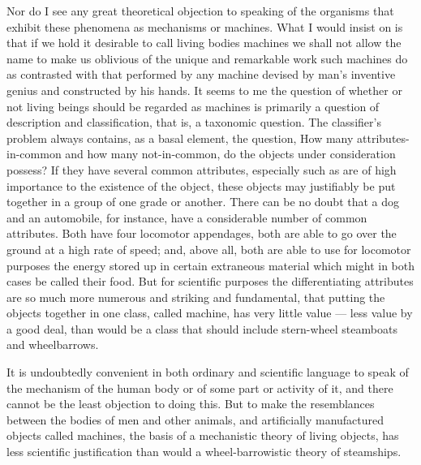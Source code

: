 \documentclass[a4paper, 11pt, oneside, polutonikogreek, english]{article}
\begin{document}
Nor do I see any great theoretical objection to speaking of the organisms that exhibit these phenomena as mechanisms or machines. What I would insist on is that if we hold it desirable to call living bodies machines we shall not allow the name to make us oblivious of the unique and remarkable work such machines do as contrasted with that performed by any machine devised by man's inventive genius and constructed by his hands. It seems to me the question of whether or not living beings should be regarded as machines is primarily a question of description and classification, that is, a taxonomic question. The classifier's problem always contains, as a basal element, the question, How many attributes-in-common and how many not-in-common, do the objects under consideration possess? If they have several common attributes, especially such as are of high importance to the existence of the object, these objects may justifiably be put together in a group of one grade or another. There can be no doubt that a dog and an automobile, for instance, have a considerable number of common attributes. Both have four locomotor appendages, both are able to go over the ground at a high rate of speed; and, above all, both are able to use for locomotor purposes the energy stored up in certain extraneous material which might in both cases be called their food. But for scientific purposes the differentiating attributes are so much more numerous and striking and fundamental, that putting the objects together in one class, called machine, has very little value --- less value by a good deal, than would be a class that should include stern-wheel steamboats and wheelbarrows.

It is undoubtedly convenient in both ordinary and scientific language to speak of the mechanism of the human body or of some part or activity of it, and there cannot be the least objection to doing this. But to make the resemblances between the bodies of men and other animals, and artificially manufactured objects called machines, the basis of a mechanistic theory of living objects, has less scientific justification than would a wheel-barrowistic theory of steamships.

\subsection{}
\end{document}
